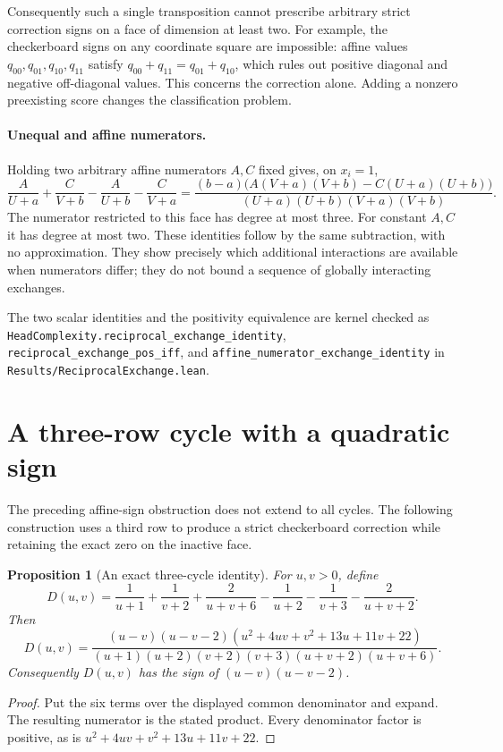 \documentclass[11pt]{article}
\newtheorem{proposition}{Proposition}
\begin{document}
Consequently such a single transposition cannot prescribe arbitrary
strict correction signs on a face of dimension at least two. For example,
the checkerboard signs on any coordinate square are impossible: affine
values $q_{00},q_{01},q_{10},q_{11}$ satisfy
$q_{00}+q_{11}=q_{01}+q_{10}$, which rules out positive diagonal and
negative off-diagonal values. This concerns the correction alone.
Adding a nonzero preexisting score changes the classification problem.

\paragraph{Unequal and affine numerators.}
Holding two arbitrary affine numerators $A,C$ fixed gives, on $x_i=1$,
\[
 \frac A{U+a}+\frac C{V+b}-\frac A{U+b}-\frac C{V+a}
 =\frac{(b-a)\big(A(V+a)(V+b)-C(U+a)(U+b)\big)}
 {(U+a)(U+b)(V+a)(V+b)}.
\]
The numerator restricted to this face has degree at most three.
For constant $A,C$ it has degree at most two. These identities follow
by the same subtraction, with no approximation. They show precisely
which additional interactions are available when numerators differ;
they do not bound a sequence of globally interacting exchanges.

The two scalar identities and the positivity equivalence are kernel
checked as \texttt{HeadComplexity.reciprocal\_exchange\_identity},
\texttt{reciprocal\_exchange\_pos\_iff}, and
\texttt{affine\_numerator\_exchange\_identity} in
\texttt{Results/ReciprocalExchange.lean}.

\section{A three-row cycle with a quadratic sign}

The preceding affine-sign obstruction does not extend to all cycles.
The following construction uses a third row to produce a strict
checkerboard correction while retaining the exact zero on the inactive
face.

\begin{proposition}[An exact three-cycle identity]
For $u,v>0$, define
\[
 D(u,v)=\frac1{u+1}+\frac1{v+2}+\frac2{u+v+6}
       -\frac1{u+2}-\frac1{v+3}-\frac2{u+v+2}.
\]
Then
\[
 D(u,v)=
 \frac{(u-v)(u-v-2)(u^2+4uv+v^2+13u+11v+22)}
 {(u+1)(u+2)(v+2)(v+3)(u+v+2)(u+v+6)}.
\]
Consequently $D(u,v)$ has the sign of $(u-v)(u-v-2)$.
\end{proposition}
\begin{proof}
Put the six terms over the displayed common denominator and expand.
The resulting numerator is the stated product. Every denominator
factor is positive, as is $u^2+4uv+v^2+13u+11v+22$.
\end{proof}
\end{document}
